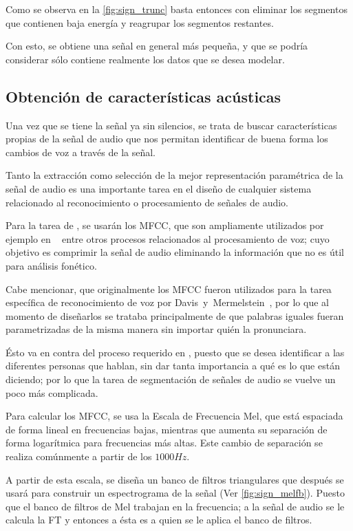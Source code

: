 Como se observa en la \autoref{fig:sign_trunc} basta entonces con eliminar los segmentos que contienen baja energía y reagrupar los segmentos restantes.

Con esto, se obtiene una señal en general más pequeña, y que se podría  considerar sólo contiene realmente los datos que se desea modelar.

\subsection{Obtención de características acústicas}

Una vez que se tiene la señal ya sin silencios, se trata de buscar características propias de la señal de audio que nos permitan identificar de buena forma los cambios de voz a través de la señal.

Tanto la extracción como selección de la mejor representación paramétrica de la señal de audio es una importante tarea en el diseño de cualquier sistema relacionado al reconocimiento o procesamiento de señales de audio. 

Para la tarea de \sd, se usarán los \ac{MFCC}, que son ampliamente utilizados por ejemplo en \sd~ entre otros procesos relacionados al procesamiento de voz; cuyo objetivo es comprimir la señal de audio eliminando la información que no es útil para análisis fonético.

Cabe mencionar, que originalmente los \ac{MFCC} fueron utilizados para la tarea específica de reconocimiento de voz por Davis~y~Mermelstein~\cite{Davis1980}, por lo que al momento de diseñarlos se trataba principalmente de que palabras iguales fueran parametrizadas de la misma manera sin importar quién la pronunciara. 

Ésto va en contra del proceso requerido en \sd, puesto que se desea identificar a las diferentes personas que hablan, sin dar tanta importancia a qué es lo que están diciendo; por lo que la tarea de segmentación de señales de audio se vuelve un poco más complicada.

Para calcular los \ac{MFCC}, se usa la Escala de Frecuencia Mel, que está espaciada de forma lineal en frecuencias bajas, mientras que aumenta su separación de forma logarítmica para frecuencias más altas. Este cambio de separación se realiza comúnmente a partir de los $1000Hz$. 

A partir de esta escala, se diseña un banco de filtros triangulares que después se usará para construir un espectrograma de la señal (Ver \autoref{fig:sign_melfb}). Puesto que el banco de filtros de Mel trabajan en la frecuencia; a la señal de audio se le calcula la \ac{FT} y entonces a ésta es a quien se le aplica el banco de filtros.

